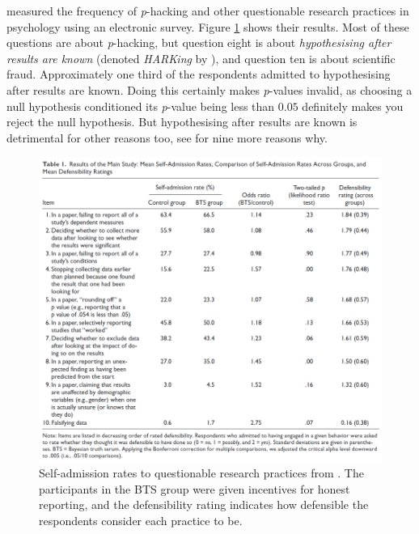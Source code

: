 \textcite{John2012-xp} measured the frequency of \emph{p}-hacking and other questionable research practices in psychology using an electronic survey. Figure \ref{fig:john2012} shows their results. Most of these questions are about \emph{p}-hacking, but question eight is about \emph{hypothesising after results are known} (denoted \emph{HARKing} by \textcite{Kerr1998-by}), and question ten is about scientific fraud. Approximately one third of the respondents admitted to hypothesising after results are known. Doing this certainly makes \emph{p}-values invalid, as choosing a null hypothesis conditioned its \emph{p}-value being less than $0.05$ definitely makes you reject the null hypothesis. But hypothesising after results are known is detrimental for other reasons too, see \textcite[p. 205]{Kerr1998-by} for nine more reasons why.

\begin{figure}
\noindent \begin{centering}
\includegraphics[scale=0.4]{figures/john2012}
\par\end{centering}
\caption{\label{fig:john2012}Self-admission rates to questionable research practices from \textcite{John2012-xp}. The participants in the BTS group were given incentives for honest reporting, and the defensibility rating indicates how defensible the respondents consider each practice to be.}
\end{figure}

